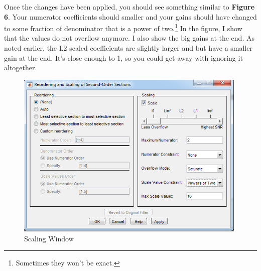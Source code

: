 \documentclass[12pt,a4paper,titlepage]{article}
\begin{document}
Once the changes have been applied, you should see something similar to
\textbf{Figure 6}. Your numerator coefficients should smaller and your gains
should have changed to some fraction of denominator that is a power of
two.\footnote{Sometimes they won't be exact.} In the figure, I show that the
values do not overflow anymore. I also show the big gains at the end. As noted
earlier, the L2 scaled coefficients are slightly larger and but have a smaller
gain at the end. It's close enough to 1, so you could get away with ignoring
it altogether.

\begin{figure}[!htb]
  \centering
  \includegraphics[height=8cm]
                  {../presentation/scaled-window.png}
                  \caption{Scaling Window}
\end{figure}
\end{document}
